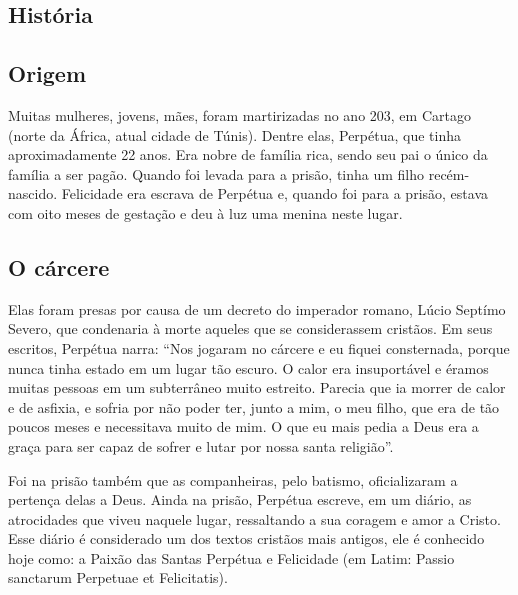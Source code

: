 \documentclass[18pt]{article}
\begin{document}
\begin{justify}

 \begin{center}
  \section{História}\label{sec:História} %
 \end{center}





  \begin{justify}
  \subsection{Origem}
 \end{justify}

Muitas mulheres, jovens, mães, foram martirizadas no ano 203, em Cartago (norte da África, atual cidade de Túnis). Dentre elas, Perpétua, que tinha aproximadamente 22 anos. Era nobre de família rica, sendo seu pai o único da família a ser pagão. Quando foi levada para a prisão, tinha um filho recém-nascido. Felicidade era escrava de Perpétua e, quando foi para a prisão, estava com oito meses de gestação e deu à luz uma menina neste lugar.


 \begin{justify}
 \subsection{O cárcere}
 \end{justify}

Elas foram presas por causa de um decreto do imperador romano, Lúcio Septímo Severo, que condenaria à morte aqueles que se considerassem cristãos. Em seus escritos, Perpétua narra: “Nos jogaram no cárcere e eu fiquei consternada, porque nunca tinha estado em um lugar tão escuro. O calor era insuportável e éramos muitas pessoas em um subterrâneo muito estreito. Parecia que ia morrer de calor e de asfixia, e sofria por não poder ter, junto a mim, o meu filho, que era de tão poucos meses e necessitava muito de mim. O que eu mais pedia a Deus era a graça para ser capaz de sofrer e lutar por nossa santa religião”.

Foi na prisão também que as companheiras, pelo batismo, oficializaram a pertença delas a Deus. Ainda na prisão, Perpétua escreve, em um diário, as atrocidades que viveu naquele lugar, ressaltando a sua coragem e amor a Cristo. Esse diário é considerado um dos textos cristãos mais antigos, ele é conhecido hoje como: a Paixão das Santas Perpétua e Felicidade (em Latim: Passio sanctarum Perpetuae et Felicitatis).


\end{justify}
\end{document}
